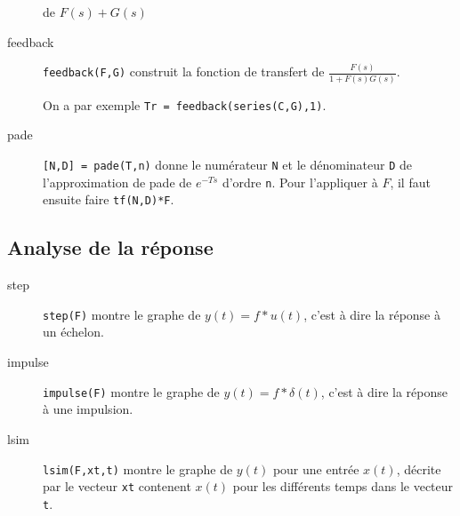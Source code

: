 \begin{description}
    de $F(s) + G(s)$
    \begin{center}
    \end{center}
  \item[feedback] \lstinline|feedback(F,G)| construit la fonction de transfert
    de $\frac{F(s)}{1+F(s)G(s)}$.
    \begin{center}
    \end{center}
    On a par exemple \lstinline|Tr = feedback(series(C,G),1)|.
  \item[pade] \lstinline|[N,D] = pade(T,n)| donne le numérateur \lstinline|N|
    et le dénominateur \lstinline|D| de l'approximation de pade de $e^{-Ts}$ d'ordre
    \lstinline|n|.
    Pour l'appliquer à $F$, il faut ensuite faire \lstinline|tf(N,D)*F|.
\end{description}

\subsection{Analyse de la réponse}
\begin{description}
  \item[step] \lstinline|step(F)| montre le graphe de $y(t) = f * u(t)$,
    c'est à dire la réponse à un échelon.
  \item[impulse] \lstinline|impulse(F)| montre le graphe de $y(t) = f * \delta(t)$,
    c'est à dire la réponse à une impulsion.
  \item[lsim] \lstinline|lsim(F,xt,t)| montre le graphe de $y(t)$ pour une entrée $x(t)$,
    décrite par le vecteur \lstinline|xt| contenent $x(t)$ pour les différents
    temps dans le vecteur \lstinline|t|.
\end{description}

